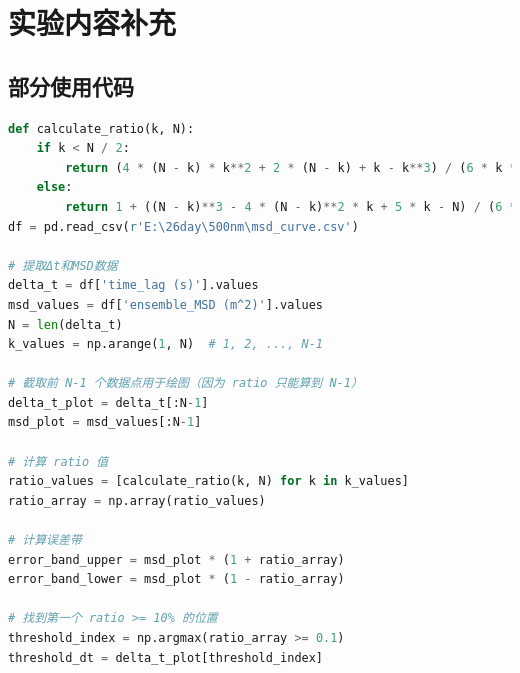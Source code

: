 \documentclass[a4paper]{report} %
\begin{document}
\section{实验内容补充}
\subsection{部分使用代码}
\begin{lstlisting}[language=Python, caption=有效拟合区间的选取, label=code:calculate1]
def calculate_ratio(k, N):
    if k < N / 2:
        return (4 * (N - k) * k**2 + 2 * (N - k) + k - k**3) / (6 * k * (N - k)**2)
    else:
        return 1 + ((N - k)**3 - 4 * (N - k)**2 * k + 5 * k - N) / (6 * k**2 * (N - k))
df = pd.read_csv(r'E:\26day\500nm\msd_curve.csv')

# 提取Δt和MSD数据
delta_t = df['time_lag (s)'].values
msd_values = df['ensemble_MSD (m^2)'].values
N = len(delta_t)
k_values = np.arange(1, N)  # 1, 2, ..., N-1

# 截取前 N-1 个数据点用于绘图（因为 ratio 只能算到 N-1）
delta_t_plot = delta_t[:N-1]
msd_plot = msd_values[:N-1]

# 计算 ratio 值
ratio_values = [calculate_ratio(k, N) for k in k_values]
ratio_array = np.array(ratio_values)

# 计算误差带
error_band_upper = msd_plot * (1 + ratio_array)
error_band_lower = msd_plot * (1 - ratio_array)

# 找到第一个 ratio >= 10% 的位置
threshold_index = np.argmax(ratio_array >= 0.1)
threshold_dt = delta_t_plot[threshold_index]
\end{lstlisting}
\end{document}
